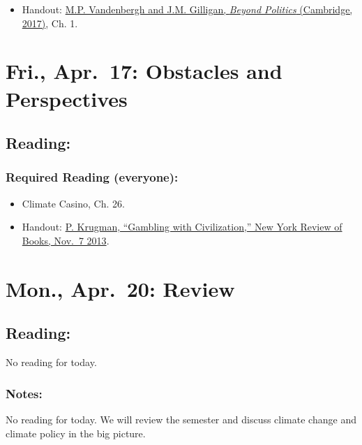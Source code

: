 \documentclass[
]{article}
\providecommand{\tightlist}{%
  \setlength{\itemsep}{0pt}\setlength{\parskip}{0pt}}
\begin{document}
\begin{itemize}
\tightlist
\item
  Handout:
  \href{/files/reading_handouts/Beyond_Politics_Chapter_1.pdf}{M.P.
  Vandenbergh and J.M. Gilligan, \emph{Beyond Politics} (Cambridge,
  2017)}, Ch. 1.
\end{itemize}

\hypertarget{fri.-apr.-17-obstacles-and-perspectives}{%
\section{Fri., Apr.~17: Obstacles and
Perspectives}\label{fri.-apr.-17-obstacles-and-perspectives}}

\hypertarget{reading-40}{%
\subsection{Reading:}\label{reading-40}}

\hypertarget{required-reading-everyone-35}{%
\subsubsection{Required Reading
(everyone):}\label{required-reading-everyone-35}}

\begin{itemize}
\tightlist
\item
  Climate Casino, Ch. 26.
\item
  Handout:
  \href{/files/reading_handouts/Krugman-GamblingWithCivilization-2013.pdf}{P.
  Krugman, ``Gambling with Civilization,'' New York Review of Books,
  Nov.~7 2013}.
\end{itemize}

\hypertarget{mon.-apr.-20-review}{%
\section{Mon., Apr.~20: Review}\label{mon.-apr.-20-review}}

\hypertarget{reading-41}{%
\subsection{Reading:}\label{reading-41}}

No reading for today.

\hypertarget{notes-4}{%
\subsubsection{Notes:}\label{notes-4}}

No reading for today. We will review the semester and discuss climate
change and climate policy in the big picture.
\end{document}
